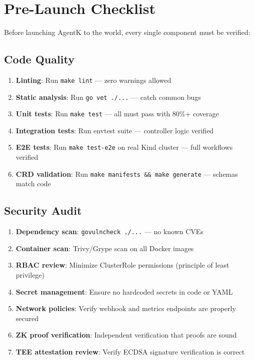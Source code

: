 \documentclass[12pt,a4paper,openany]{report}
\begin{document}
\chapter{Pre-Launch Checklist}

Before launching AgentK to the world, every single component must be verified:

\section{Code Quality}

\begin{enumerate}
    \item \textbf{Linting}: Run \texttt{make lint} — zero warnings allowed
    \item \textbf{Static analysis}: Run \texttt{go vet ./...} — catch common bugs
    \item \textbf{Unit tests}: Run \texttt{make test} — all must pass with 80\%+ coverage
    \item \textbf{Integration tests}: Run envtest suite — controller logic verified
    \item \textbf{E2E tests}: Run \texttt{make test-e2e} on real Kind cluster — full workflows verified
    \item \textbf{CRD validation}: Run \texttt{make manifests \&\& make generate} — schemas match code
\end{enumerate}

\section{Security Audit}

\begin{enumerate}
    \item \textbf{Dependency scan}: \texttt{govulncheck ./...} — no known CVEs
    \item \textbf{Container scan}: Trivy/Grype scan on all Docker images
    \item \textbf{RBAC review}: Minimize ClusterRole permissions (principle of least privilege)
    \item \textbf{Secret management}: Ensure no hardcoded secrets in code or YAML
    \item \textbf{Network policies}: Verify webhook and metrics endpoints are properly secured
    \item \textbf{ZK proof verification}: Independent verification that proofs are sound
    \item \textbf{TEE attestation review}: Verify ECDSA signature verification is correct
\end{enumerate}
\end{document}
